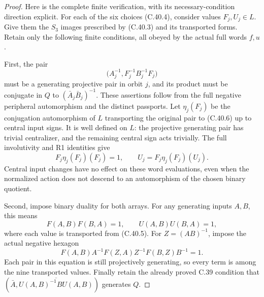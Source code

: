\begin{proof}
Here is the complete finite verification, with its
necessary-condition direction explicit. For each of
the six choices (C.40.4), consider values
\(F_j,U_j\in L\). Give them the \(S_3\) images prescribed
by (C.40.3) and its transported forms. Retain only the
following finite conditions, all obeyed by the actual
full words \(f,u\).

First, the pair
\[
       \bigl(A_j^{-1},F_j^{-1}B_j^{-1}F_j\bigr)
 \tag{C.40.6}
\]
must be a generating projective pair in orbit \(j\), and
its product must be conjugate in \(Q\) to
\((\bar A_j\bar B_j)^{-1}\). These assertions follow
from the full negative peripheral automorphism and the
distinct passports. Let \(\eta_j(F_j)\) be the conjugation
automorphism of \(L\) transporting the original pair
to (C.40.6) up to central input signs. It is well defined
on \(L\): the projective generating pair has trivial
centralizer, and the remaining central sign acts trivially.
The full involutivity and R1 identities give
\[
             F_j\eta_j(F_j)(F_j)=1,\qquad
             U_j=F_j\eta_j(F_j)(U_j).
 \tag{C.40.7}
\]
Central input changes have no effect on these word
evaluations, even when the normalized action does not
descend to an automorphism of the chosen binary quotient.

Second, impose binary duality for both arrays. For any
generating inputs \(A,B\), this means
\[
                      F(A,B)F(B,A)=1,\qquad
                      U(A,B)U(B,A)=1,
\]
where each value is transported from (C.40.5).
For \(Z=(AB)^{-1}\), impose the actual negative hexagon
\[
                  F(A,B)A^{-1}F(Z,A)Z^{-1}F(B,Z)B^{-1}=1.
 \tag{C.40.8}
\]
Each pair in this equation is still projectively generating,
so every term is among the nine transported values.
Finally retain the already proved C.39 condition that
\((\bar A,\overline{U(A,B)^{-1}BU(A,B)})\) generates \(Q\).


\end{proof}
